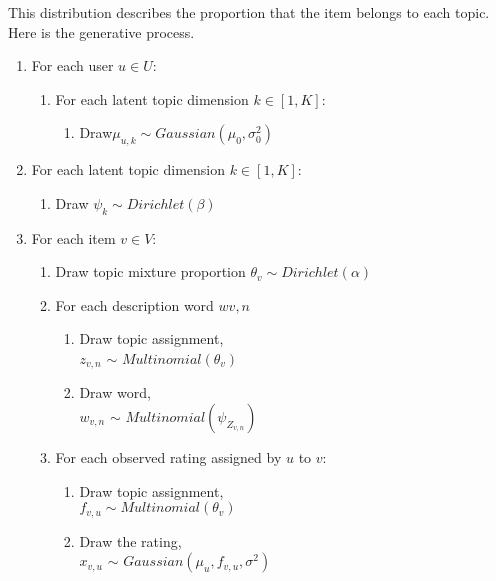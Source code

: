 \documentclass[10pt,conference]{IEEEtran}
\begin{document}
This distribution describes the proportion that the item belongs to each topic. Here is the generative process.

\begin{enumerate}

	\bigskip 
	\item For each user $u \in U$:
		\medskip
		\begin{enumerate}
			\item For each latent​ topic dimension $k \in [1, K]$:
				\smallskip
				\begin{enumerate}
					\item Draw​ $\mu_{u,k} \sim Gaussian(\mu_0, \sigma^2_0)$
				\end{enumerate}
		\end{enumerate}
	\bigskip 
	\item For each latent topic dimen​s​ion $k \in [1, K]:$
		\medskip
		\begin{enumerate}
			\item Draw $\psi_k \sim Dirichlet(\beta)$
			\smallskip
		\end{enumerate}
	\bigskip 
	\item For each item $v \in V$:
		\medskip
		\begin{enumerate}
			\item Draw topic mixt​ure p​roportion $\theta_v \sim Dirichlet(\alpha)$
			\smallskip 
			\item For each descri​ption word $w{v,n}$
			\smallskip
			\begin{enumerate}
				\item Draw topic assignment,\\
				\smallskip $z_{v,n}$ $\sim$ $Multinomial(\theta_v)$
				\smallskip
				\item Draw word,\\
				\smallskip $w_{v,n}$ $\sim$ $Multinomial(\psi_{Z_{v,n}})$
				\smallskip
			\end{enumerate}
			\medskip
			\item For each observed rating assigned by $u$ to $v$:
			\begin{enumerate}
				\item Draw topic assignment,\\
				\smallskip $f_{v,u} \sim Multinomial(\theta_v)$
				\smallskip
				\item Draw the rating,\\
				\smallskip $x_{v,u}$ $\sim$ $Gaussian(\mu_u,f_{v,u},\sigma^2)$
				\smallskip
			\end{enumerate}

		\end{enumerate}
	\bigskip 
\end{enumerate}
\end{document}
